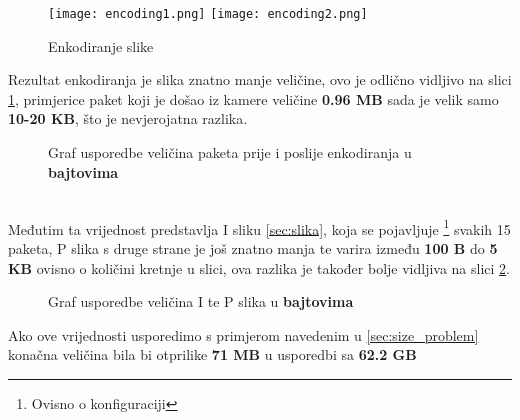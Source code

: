 \begin{figure}[h]
  \texttt{[image: encoding1.png]}
  \texttt{[image: encoding2.png]}
  \caption{Enkodiranje slike}
\end{figure}
\noindent
Rezultat enkodiranja je slika znatno manje veličine, ovo je odlično vidljivo na slici \ref{graf:packet_size}, primjerice 
paket koji je došao iz kamere veličine  \textbf{0.96 MB} sada je velik samo \textbf{10-20 KB}, što je nevjerojatna razlika.
\begin{figure}[h]
  \centering
  \caption[Graf usporedbe veličina paketa prije i poslije enkodiranja]{Graf usporedbe veličina paketa prije i poslije enkodiranja u \textbf{bajtovima}} \label{pic:packet_size}
  \label{graf:packet_size}
\end{figure}
\\
Međutim ta vrijednost predstavlja I sliku \ref{sec:slika}, koja se pojavljuje \footnote{Ovisno o konfiguraciji} svakih 15
paketa, P slika s druge strane je još znatno manja te varira između \textbf{100 B} do \textbf{5 KB} ovisno o količini
kretnje u slici, ova razlika je također bolje vidljiva na slici \ref{graf:graf_ip_frames}.
\begin{figure}[H]
  \centering
  \caption[Graf usporedbe veličina I i P slika]{Graf usporedbe veličina I te P slika u \textbf{bajtovima}} \label{pic:pict_type}
  \label{graf:graf_ip_frames}
\end{figure}
\noindent
Ako ove vrijednosti usporedimo s primjerom navedenim u \ref{sec:size_problem} konačna veličina bila bi otprilike 
\textbf{71 MB} u usporedbi sa \textbf{62.2 GB}

